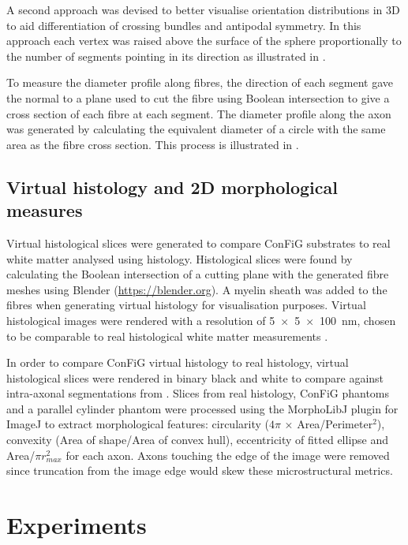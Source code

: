 A second approach was devised to better visualise orientation distributions in 3D to aid differentiation of crossing bundles and antipodal symmetry. In this approach each vertex was raised above the surface of the sphere proportionally to the number of segments pointing in its direction as illustrated in .

To measure the diameter profile along fibres, the direction of each segment gave the normal to a plane used to cut the fibre using Boolean intersection to give a cross section of each fibre at each segment. The diameter profile along the axon was generated by calculating the equivalent diameter of a circle with the same area as the fibre cross section. This process is illustrated in .

\subsection{Virtual histology and 2D morphological measures}
\label{sec:confg_virtual_histology}
Virtual histological slices were generated to compare \ac{ConFiG} substrates to real white matter analysed using histology. Histological slices were found by calculating the Boolean intersection of a cutting plane with the generated fibre meshes using Blender (\url{https://blender.org}). A myelin sheath was added to the fibres when generating virtual histology for visualisation purposes.  Virtual histological images were rendered with a resolution of \SI{5 x 5 x 100}{\nano\metre}, chosen to be comparable to real histological white matter measurements \cite{Abdollahzadeh2019,Lee2019b}.

In order to compare \ac{ConFiG} virtual histology to real histology, virtual histological slices were rendered in binary black and white to compare against intra-axonal segmentations from \cite{Lee2019b}. Slices from real histology, \ac{ConFiG} phantoms and a parallel cylinder phantom were processed using the MorphoLibJ plugin for ImageJ \cite{Rueden2017,Legland2016,Schindelin2012,Schneider2012} to extract morphological features: circularity ($4\pi$ × Area/Perimeter$^2$), convexity (Area of shape/Area of convex hull), eccentricity of fitted ellipse and Area/$\pi r_{max}^2$ for each axon. Axons touching the edge of the image were removed since truncation from the image edge would skew these microstructural metrics.

\section{Experiments}
\label{sec:micro_experiments}

